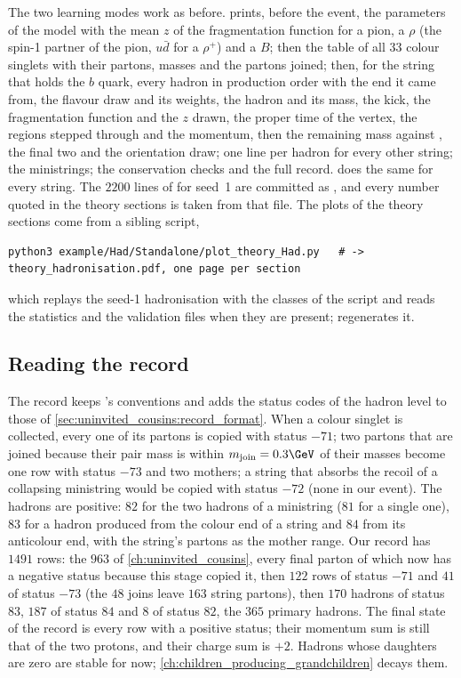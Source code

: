 The two learning modes work as before.  prints, before the
event, the parameters of the model with the mean $z$ of the fragmentation
function for a pion, a $\rho$ (the spin-1 partner of the pion, $u\bar d$
for a $\rho^+$) and a $B$; then the table of all 33 colour
singlets with their partons, masses and the partons joined; then, for the
string that holds the $b$ quark, every hadron in production order with the
end it came from, the flavour draw and its weights, the hadron and its mass,
the \pt kick, the fragmentation function and the $z$ drawn, the proper time
of the vertex, the regions stepped through and the momentum, then the
remaining mass against \Wmin, the final two and the orientation draw; one
line per hadron for every other string; the ministrings; the conservation
checks and the full record.  does the same for every string. The
$2200$ lines of  for seed~1 are committed as
, and every
number quoted in the theory sections is taken from that file. The plots of
the theory sections come from a sibling script,
\begin{verbatim}
python3 example/Had/Standalone/plot_theory_Had.py   # -> theory_hadronisation.pdf, one page per section
\end{verbatim}
which replays the seed-1 hadronisation with the classes of the script and
reads the  statistics and the \PYTHIA validation files when
they are present;  regenerates it.

\subsection{Reading the record}
\label{sec:children_getting_married:record_format}

The record keeps \PYTHIA's conventions and adds the status codes of the
hadron level to those of \cref{sec:uninvited_cousins:record_format}. When a
colour singlet is collected, every one of its partons is copied with status
$-71$; two partons that are joined because their pair mass is within
$m_{\mathrm{join}}=0.3\GeV$ of their masses become one row with status
$-73$ and two mothers; a string that absorbs the recoil of a collapsing
ministring would be copied with status $-72$ (none in our event). The
hadrons are positive: $82$ for the two hadrons of a ministring ($81$ for a
single one), $83$ for a hadron produced from the colour end of a string and
$84$ from its anticolour end, with the string's partons as the mother range.
Our record has $1491$ rows: the $963$ of \cref{ch:uninvited_cousins}, every
final parton of which now has a negative status because this stage copied
it, then $122$ rows of status $-71$ and $41$ of status $-73$ (the $48$ joins
leave $163$ string partons), then $170$ hadrons of status $83$, $187$ of
status $84$ and $8$ of status $82$, the $365$ primary hadrons. The final
state of the record is every row with a positive status; their momentum sum
is still that of the two protons, and their charge sum is $+2$. Hadrons
whose daughters are zero are stable for now; \cref{ch:children_producing_grandchildren}
decays them.

